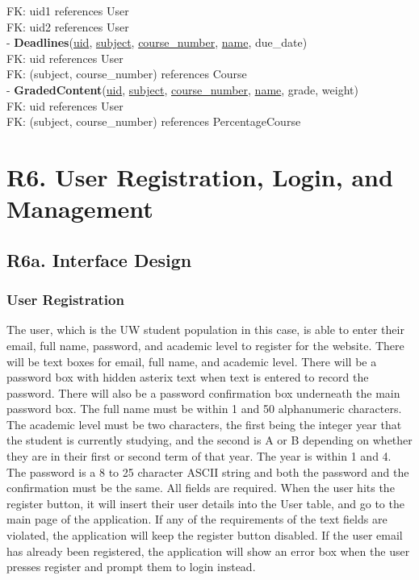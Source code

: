 \documentclass[12pt, a4paper]{article}
\begin{document}
FK: uid1 references User\\
FK: uid2 references User\\
- \textbf{Deadlines}(\underline{uid}, \underline{subject}, \underline{course\_number}, \underline{name}, due\_date)\\
FK: uid references User\\
FK: (subject, course\_number) references Course\\
- \textbf{GradedContent}(\underline{uid}, \underline{subject}, \underline{course\_number}, \underline{name}, grade, weight)\\
FK: uid references User\\
FK: (subject, course\_number) references PercentageCourse\\

\section*{R6. User Registration, Login, and Management}
\label{sec:R6}
\subsection*{R6a. Interface Design}
\subsubsection*{User Registration}
The user, which is the UW student population in this case, is able to enter their email, full name, password, and academic level to register for the website. There will be text boxes for email, full name, and academic level. There will be a password box with hidden asterix text when text is entered to record the password. There will also be a password confirmation box underneath the main password box. The full name must be within 1 and 50 alphanumeric characters. The academic level must be two characters, the first being the integer year that the student is currently studying, and the second is A or B depending on whether they are in their first or second term of that year. The year is within 1 and 4. The password is a 8 to 25 character ASCII string and both the password and the confirmation must be the same. All fields are required. When the user hits the register button, it will insert their user details into the User table, and go to the main page of the application. If any of the requirements of the text fields are violated, the application will keep the register button disabled. If the user email has already been registered, the application will show an error box when the user presses register and prompt them to login instead.
\end{document}

